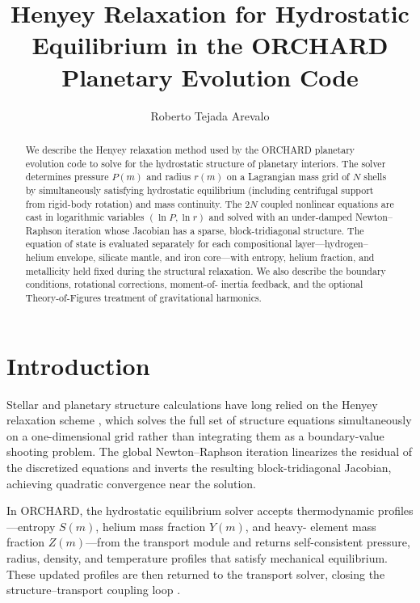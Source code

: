 \documentclass{aastex631}
\begin{document}
\title{Henyey Relaxation for Hydrostatic Equilibrium in the ORCHARD Planetary Evolution Code}

\author{Roberto Tejada Arevalo}

\begin{abstract}
We describe the Henyey relaxation method used by the ORCHARD planetary
evolution code to solve for the hydrostatic structure of planetary
interiors.  The solver determines pressure $P(m)$ and radius $r(m)$ on a
Lagrangian mass grid of $N$ shells by simultaneously satisfying
hydrostatic equilibrium (including centrifugal support from rigid-body
rotation) and mass continuity.  The $2N$ coupled nonlinear equations are
cast in logarithmic variables $(\ln P,\ln r)$ and solved with an
under-damped Newton--Raphson iteration whose Jacobian has a sparse,
block-tridiagonal structure.  The equation of state is evaluated
separately for each compositional layer---hydrogen--helium envelope,
silicate mantle, and iron core---with entropy, helium fraction, and
metallicity held fixed during the structural relaxation.  We also
describe the boundary conditions, rotational corrections, moment-of-%
inertia feedback, and the optional Theory-of-Figures treatment of
gravitational harmonics.
\end{abstract}


\section{Introduction}\label{sec:intro}

Stellar and planetary structure calculations have long relied on the
Henyey relaxation scheme \citep{Henyey1964}, which solves the full set
of structure equations simultaneously on a one-dimensional grid rather
than integrating them as a boundary-value shooting problem.  The global
Newton--Raphson iteration linearizes the residual of the discretized
equations and inverts the resulting block-tridiagonal Jacobian, achieving
quadratic convergence near the solution.

In ORCHARD, the hydrostatic equilibrium solver accepts thermodynamic
profiles---entropy $S(m)$, helium mass fraction $Y(m)$, and heavy-%
element mass fraction $Z(m)$---from the transport module and returns
self-consistent pressure, radius, density, and temperature profiles that
satisfy mechanical equilibrium.  These updated profiles are then returned
to the transport solver, closing the structure--transport coupling loop
\citep{Sur2024}.
\end{document}
